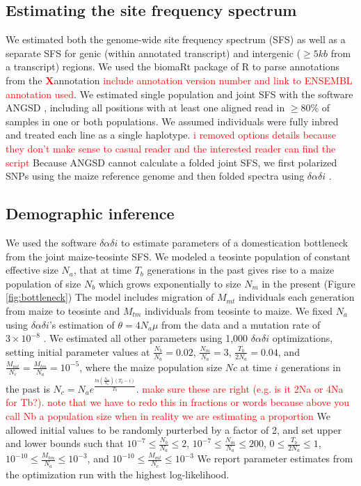 \documentclass{pnastwo}
\newcommand{\jri}[1]{\textcolor{red}{\scriptsize #1}}
\newcommand{\X}{\textcolor{red}{\bf X}}
\begin{document}
\begin{article}
\begin{materials}
\subsection{Estimating the site frequency spectrum}
We estimated both the genome-wide site frequency spectrum (SFS) as well as a separate SFS for genic (within annotated transcript) and intergenic ($\geq 5kb$ from a transcript) regions. 
We used the biomaRt package \cite{durinck2009,durinck2005} of R \cite{R2014} to parse annotations from the \X annotation \jri{include annotation version number and link to ENSEMBL annotation used}. 
We estimated single population and joint SFS with the software ANGSD \cite{korneliussen2014}, including all positions with at least one aligned read in $\geq 80\%$ of samples in one or both populations.
We assumed individuals were fully inbred and treated each line as a single haplotype. \jri{i removed options details because they don't make sense to casual reader and the interested reader can find the script}
Because ANGSD cannot calculate a folded joint SFS, we first polarized SNPs using the maize reference genome and then folded spectra using $\delta\alpha\delta{i}$ \cite{gutenkunst2009}.

\subsection{Demographic inference}
We used the software $\delta\alpha\delta{i}$ \cite{gutenkunst2009} to estimate parameters of a domestication bottleneck from the joint maize-teosinte SFS.
We modeled a teosinte population of constant effective size $N_a$, that at time $T_b$ generations in the past gives rise to a maize population of size $N_b$ which grows exponentially to size $N_m$ in the present (Figure \ref{fig:bottleneck})
The model includes migration of $M_{mt}$ individuals each generation from maize to teosinte and $M_{tm}$ individuals from teosinte to maize.  
We fixed $N_a$ using $\delta\alpha\delta{i}$'s estimation of $\theta=4N_a\mu$ from the data and a mutation rate of $3 \times 10^{-8}$ \cite{clark2005}. 
We estimated all other parameters using 1,000 $\delta\alpha\delta{i}$ optimizations, setting initial parameter values at $\frac{N_b}{N_a}=0.02$, $\frac{N_m}{N_a}=3$, $\frac{T_b}{2N_a}=0.04$, and $\frac{M_{mt}}{N_c}=\frac{M_{tm}}{N_a}=10^{-5}$, where the maize population size $Nc$ at time $i$ generations in the past is $N_c=N_ae^{\frac{ln(\frac{N_m}{N_a})(T_b-i)}{T_b}}$.
\jri{make sure these are right (e.g. is it 2Na or 4Na for Tb?). note that we have to redo this in fractions or words because above you call Nb a population size when in reality we are estimating a proportion}
We allowed initial values to be randomly purterbed by a factor of 2, and set upper and lower bounds such that $10^{-7} \leq \frac{N_b}{N_a} \leq 2$, $10^{-7} \leq \frac{N_m}{N_a} \leq{200}$, $0 \leq \frac{T_b}{2N_a} \leq 1$, $10^{-10}\leq \frac{M_{tm}}{N_a}\leq 10^{-3}$, and $10^{-10}\leq \frac{M_{mt}}{N_c}\leq 10^{-3}$
We report parameter estimates from the optimization run with the highest log-likelihood.


\end{materials}
\end{article}
\end{document}
